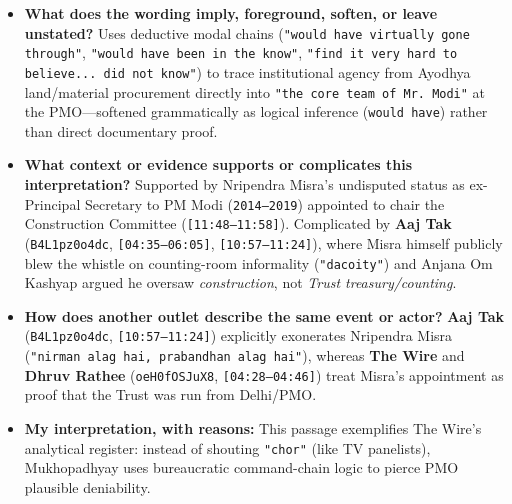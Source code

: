 \documentclass[10pt,a4paper]{article}
\begin{document}
\begin{itemize}[leftmargin=1.5em, itemsep=3pt, topsep=4pt]
  \item \textbf{What does the wording imply, foreground, soften, or leave unstated?} Uses deductive modal chains (\texttt{"would have virtually gone through"}, \texttt{"would have been in the know"}, \texttt{"find it very hard to believe... did not know"}) to trace institutional agency from Ayodhya land/material procurement directly into \texttt{"the core team of Mr. Modi"} at the PMO---softened grammatically as logical inference (\texttt{would have}) rather than direct documentary proof.
  \item \textbf{What context or evidence supports or complicates this interpretation?} Supported by Nripendra Misra's undisputed status as ex-Principal Secretary to PM Modi (\texttt{2014--2019}) appointed to chair the Construction Committee (\texttt{[11:48--11:58]}). Complicated by \textbf{Aaj Tak} (\texttt{B4L1pz0o4dc}, \texttt{[04:35--06:05]}, \texttt{[10:57--11:24]}), where Misra himself publicly blew the whistle on counting-room informality (\texttt{"dacoity"}) and Anjana Om Kashyap argued he oversaw \textit{construction}, not \textit{Trust treasury/counting}.
  \item \textbf{How does another outlet describe the same event or actor?} \textbf{Aaj Tak} (\texttt{B4L1pz0o4dc}, \texttt{[10:57--11:24]}) explicitly exonerates Nripendra Misra (\texttt{"nirman alag hai, prabandhan alag hai"}), whereas \textbf{The Wire} and \textbf{Dhruv Rathee} (\texttt{oeH0fOSJuX8}, \texttt{[04:28--04:46]}) treat Misra's appointment as proof that the Trust was run from Delhi/PMO.
  \item \textbf{My interpretation, with reasons:} This passage exemplifies The Wire's analytical register: instead of shouting \texttt{"chor"} (like TV panelists), Mukhopadhyay uses bureaucratic command-chain logic to pierce PMO plausible deniability.
\end{itemize}
\end{document}

